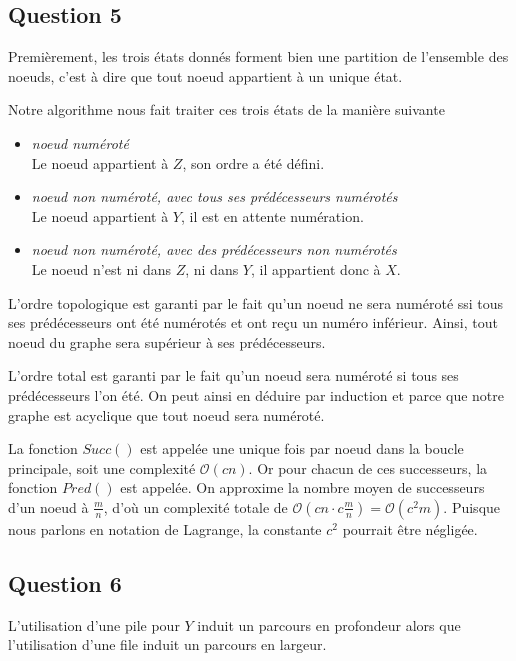 \documentclass[11pt]{article}
\begin{document}
  \subsection{Question 5}
    Premièrement, les trois états donnés forment bien une partition de
    l'ensemble des noeuds, c'est à dire que tout noeud appartient à un unique
    état.

    Notre algorithme nous fait traiter ces trois états de la manière suivante
    \begin{itemize}
      \item \emph{noeud numéroté} \\
        Le noeud appartient à $Z$, son ordre a été défini.
      \item \emph{noeud non numéroté, avec tous ses prédécesseurs numérotés} \\
        Le noeud appartient à $Y$, il est en attente numération.
      \item \emph{noeud non numéroté, avec des prédécesseurs non numérotés} \\
        Le noeud n'est ni dans $Z$, ni dans $Y$, il appartient donc à $X$.
    \end{itemize}

    L'ordre topologique est garanti par le fait qu'un noeud ne sera numéroté ssi
    tous ses prédécesseurs ont été numérotés et ont reçu un numéro inférieur.
    Ainsi, tout noeud du graphe sera supérieur à ses prédécesseurs.

    L'ordre total est garanti par le fait qu'un noeud sera numéroté si tous ses
    prédécesseurs l'on été. On peut ainsi en déduire par induction et parce que
    notre graphe est acyclique que tout noeud sera numéroté.

    La fonction $Succ()$ est appelée une unique fois par noeud dans la boucle
    principale, soit une complexité $\mathcal{O}(c n)$. Or pour chacun de ces
    successeurs, la fonction $Pred()$ est appelée. On approxime la nombre moyen
    de successeurs d'un noeud à $\frac{m}{n}$, d'où un complexité totale de
    $\mathcal{O}(c n \cdot c \frac{m}{n}) = \mathcal{O}(c^2 m)$. Puisque nous
    parlons en notation de Lagrange, la constante $c^2$ pourrait être négligée.

  \subsection{Question 6}
    L'utilisation d'une pile pour $Y$ induit un parcours en profondeur alors que
    l'utilisation d'une file induit un parcours en largeur.
\end{document}
